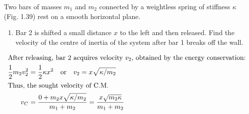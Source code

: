 \item Two bars of masses $m_1$ and $m_2$ connected by a weightless spring of stiffness $\kappa$ (Fig. 1.39) rest on a smooth horizontal plane.
    \begin{center}
    \end{center}
    \begin{center}
    \end{center}
    \begin{enumerate}
        \item Bar 2 is shifted a small distance $x$ to the left and then released. Find the velocity of the centre of inertia of the system after bar 1 breaks off the wall.
    \end{enumerate}\begin{solution}
    
    \begin{align*}
        \intertext{After releasing, bar 2 acquires velocity \(v_2\), obtained by the energy conservation:}
        \dfrac{1}{2}m_2v_2^2 &= \dfrac{1}{2}\kappa x^2 \quad \text{or} \quad v_2 = x\sqrt{\kappa/m_2} \\
        \intertext{Thus, the sought velocity of C.M.}
        v_C &= \dfrac{0 + m_2 x \sqrt{\kappa/m_2}}{m_1 + m_2} = \dfrac{x \sqrt{m_2 \kappa}}{m_1 + m_2}
    \end{align*}
\end{solution}